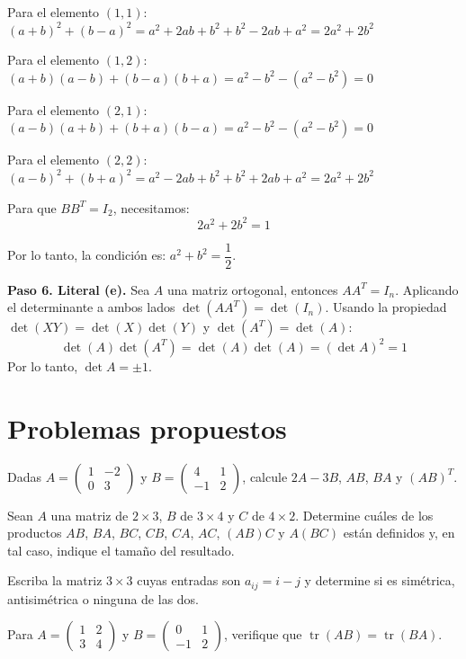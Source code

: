 \begin{prob}
\begin{myproof}
Para el elemento $(1,1)$: $(a+b)^2 + (b-a)^2 = a^2 + 2ab + b^2 + b^2 - 2ab + a^2 = 2a^2 + 2b^2$

Para el elemento $(1,2)$: $(a+b)(a-b) + (b-a)(b+a) = a^2 - b^2 - (a^2 - b^2) = 0$

Para el elemento $(2,1)$: $(a-b)(a+b) + (b+a)(b-a) = a^2 - b^2 - (a^2 - b^2) = 0$

Para el elemento $(2,2)$: $(a-b)^2 + (b+a)^2 = a^2 - 2ab + b^2 + b^2 + 2ab + a^2 = 2a^2 + 2b^2$

Para que $BB^T = I_2$, necesitamos:
$$2a^2 + 2b^2 = 1$$

Por lo tanto, la condición es: $\boxed{a^2 + b^2 = \dfrac{1}{2}}$.

\textbf{Paso 6. Literal (e).} Sea $A$ una matriz ortogonal, entonces $AA^T = I_n$. Aplicando el determinante a ambos lados $\det(AA^T) = \det(I_n).$  Usando la propiedad $\det(XY) = \det(X)\det(Y)$ y $\det(A^T) = \det(A)$:
$$\det(A)\det(A^T) = \det(A)\det(A) = (\det A)^2 = 1$$
Por lo tanto, $\boxed{\det A = \pm 1}$.
\end{myproof}
\end{prob}

\section{Problemas propuestos}

\begin{prob}
Dadas $A=\begin{pmatrix}1&-2\\0&3\end{pmatrix}$ y $B=\begin{pmatrix}4&1\\-1&2\end{pmatrix}$, calcule $2A-3B$, $AB$, $BA$ y $(AB)^T$.
\end{prob}

\begin{prob}
Sean $A$ una matriz de $2\times 3$, $B$ de $3\times 4$ y $C$ de $4\times 2$. Determine cuáles de los productos $AB$, $BA$, $BC$, $CB$, $CA$, $AC$, $(AB)C$ y $A(BC)$ están definidos y, en tal caso, indique el tamaño del resultado.
\end{prob}

\begin{prob}
Escriba la matriz $3\times 3$ cuyas entradas son $a_{ij}=i-j$ y determine si es simétrica, antisimétrica o ninguna de las dos.
\end{prob}

\begin{prob}
Para $A=\begin{pmatrix}1&2\\3&4\end{pmatrix}$ y $B=\begin{pmatrix}0&1\\-1&2\end{pmatrix}$, verifique que $\operatorname{tr}(AB)=\operatorname{tr}(BA)$.
\end{prob}


